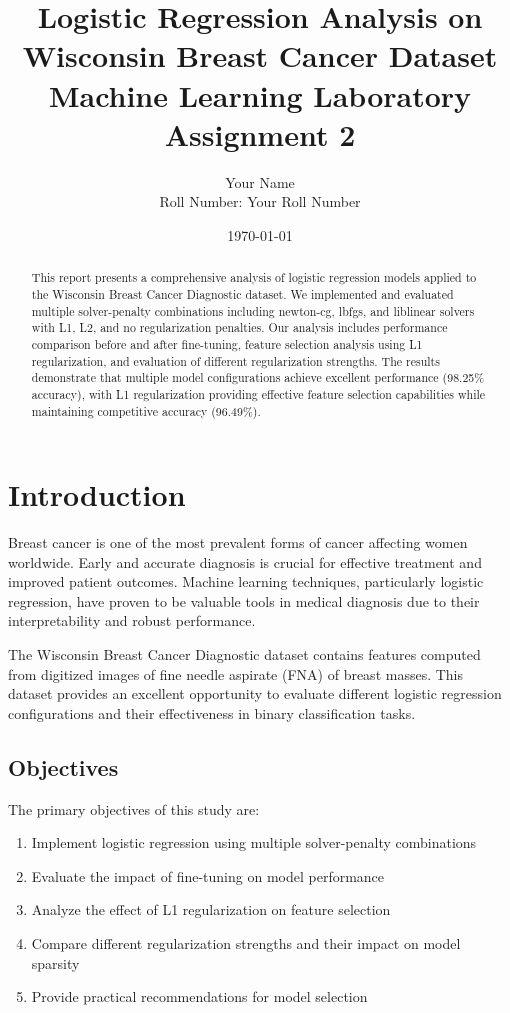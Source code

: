 \documentclass[12pt,a4paper]{article}
\title{\textbf{Logistic Regression Analysis on Wisconsin Breast Cancer Dataset}\\ 
\large Machine Learning Laboratory Assignment 2}
\author{Your Name \\ Roll Number: Your Roll Number}
\date{\today}
\begin{document}
\maketitle

\begin{abstract}
This report presents a comprehensive analysis of logistic regression models applied to the Wisconsin Breast Cancer Diagnostic dataset. We implemented and evaluated multiple solver-penalty combinations including newton-cg, lbfgs, and liblinear solvers with L1, L2, and no regularization penalties. Our analysis includes performance comparison before and after fine-tuning, feature selection analysis using L1 regularization, and evaluation of different regularization strengths. The results demonstrate that multiple model configurations achieve excellent performance (98.25\% accuracy), with L1 regularization providing effective feature selection capabilities while maintaining competitive accuracy (96.49\%).
\end{abstract}

\section{Introduction}

Breast cancer is one of the most prevalent forms of cancer affecting women worldwide. Early and accurate diagnosis is crucial for effective treatment and improved patient outcomes. Machine learning techniques, particularly logistic regression, have proven to be valuable tools in medical diagnosis due to their interpretability and robust performance.

The Wisconsin Breast Cancer Diagnostic dataset contains features computed from digitized images of fine needle aspirate (FNA) of breast masses. This dataset provides an excellent opportunity to evaluate different logistic regression configurations and their effectiveness in binary classification tasks.

\subsection{Objectives}
The primary objectives of this study are:
\begin{enumerate}
    \item Implement logistic regression using multiple solver-penalty combinations
    \item Evaluate the impact of fine-tuning on model performance
    \item Analyze the effect of L1 regularization on feature selection
    \item Compare different regularization strengths and their impact on model sparsity
    \item Provide practical recommendations for model selection
\end{enumerate}
\end{document}
